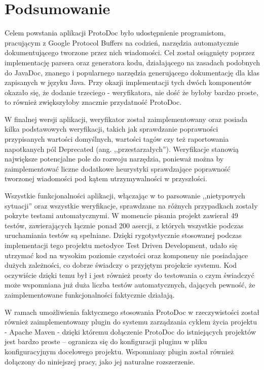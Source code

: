 \documentclass[pdflatex,11pt]{aghdpl}
\begin{document}
\chapter{Podsumowanie}
\label{cha:podsumowanie}
Celem powstania aplikacji ProtoDoc było udostępnienie programistom, pracującym z Google Protocol Buffers na codzień, narzędzia 
automatycznie dokumentującego tworzone przez nich wiadomości. Cel został osiągnięty poprzez implementację parsera 
oraz generatora kodu, działającego na zasadach podobnych do JavaDoc, znanego i popularnego narzędzia generującego dokumentację
dla klas zapisanych w języku Java. Przy okazji implementacji tych dwóch komponentów okazało się, że dodanie trzeciego - weryfikatora,
nie dość że byłoby bardzo proste, to również zwiększyłoby znacznie przydatność ProtoDoc. 

W finalnej wersji aplikacji, weryfikator został zaimplementowany oraz posiada kilka podstawowych weryfikacji, takich jak sprawdzanie poprawności
przypisanych wartości domyślnych, wartości tagów czy też raportowania napotkanych pól Deprecated (ang. ,,przestarzałych''). 
Weryfikacje stanowią największe potencjalne pole do rozwoju narzędzia, ponieważ można by zaimplementować liczne dodatkowe heurystyki 
sprawdzające poprawność tworzonej wiadomości pod kątem utrzymywalności w przyszłości.

Wszystkie funkcjonalności aplikacji, włączając w to parsowanie ,,nietypowych sytuacji'' oraz wszystkie weryfikacje, sprawdzane na różnych przypadkach
zostały pokryte testami automatycznymi. W momencie pisania projekt zawierał 49 testów, zawierających łącznie ponad 200 asercji, z których wszystkie podczas
uruchamiania testów są spełniane. Dzięki rygotystycznie stosowanej podczas implementacji tego projektu metodyce Test Driven Development, udało się utrzymać kod na 
wysokim poziomie czystości oraz komponeny nie posiadające dużych zależności, co dobrze świadczy o przyjętym projekcie systemu.
Kod oczywiście dzięki temu był i jest również prosty do testowania o czym świadczyć może wspomniana już duża liczba testów automatycznych, 
dających pewność, że zaimplementowane funkcjonalności faktycznie działają.

W ramach umożliwienia faktycznego stosowania ProtoDoc w rzeczywistości został również zaimplementowany plugin do systemu zarządzania cyklem życia projektu - 
Apache Maven \cite{Maven} - dzięki któremu dołączenie ProtoDoc do istniejących projektów jest bardzo proste -- ogranicza się do konfiguracji pluginu w pliku konfiguracyjnym docelowego projektu.
Wspomniany plugin został również dołączony do niniejszej pracy, jako jej naturalne rozszerzenie.
\end{document}
